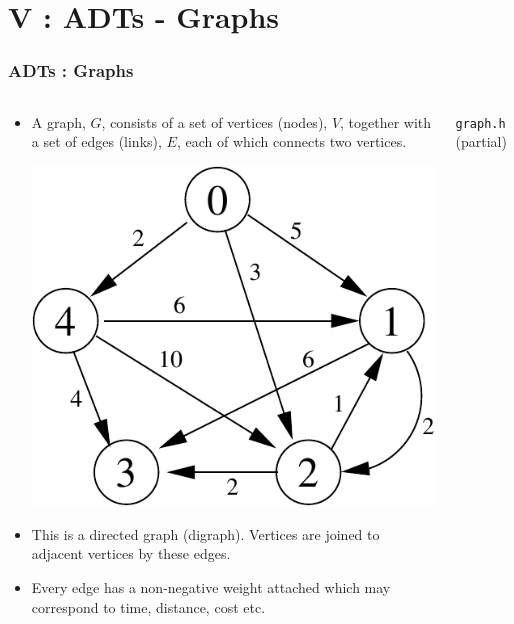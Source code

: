 \section{V : ADTs - Graphs}
\label{chap:adts_graphs}


\begin{frame}[fragile]
\frametitle{ADTs : Graphs}
\begin{columns}[T]

\begin{column}{0.45\textwidth}
\begin{itemize}[<+->]
\item A graph, $G$, consists of a set of vertices (nodes), $V$, together
with a set of edges (links), $E$, each of which connects two vertices.
\begin{center}
\includegraphics[scale=0.3]{../Images/grapha.pdf}
\end{center}
\item This is a directed graph (digraph).
Vertices are joined to adjacent vertices by these edges.
\item Every edge has a non-negative weight attached
which may correspond to time, distance, cost etc.
\end{itemize}
\end{column}

\pause
\begin{column}{0.45\textwidth}
\verb^graph.h^ (partial)

\end{column}

\end{columns}
\end{frame}

